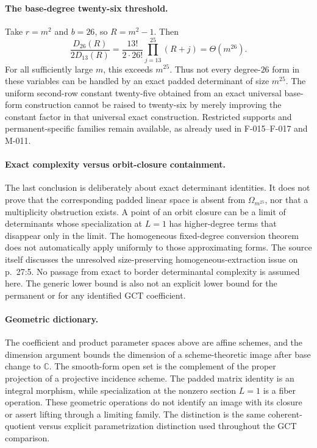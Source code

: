 \paragraph{The base-degree twenty-six threshold.}
Take $r=m^2$ and $b=26$, so $R=m^2-1$. Then
\[
 \frac{D_{26}(R)}{2D_{13}(R)}
   =\frac{13!}{2\cdot26!}\prod_{j=13}^{25}(R+j)
                         =\Theta(m^{26}).              \tag{O-016.3}
\]
For all sufficiently large $m$, this exceeds $m^{25}$.
Thus not every degree-$26$ form in these variables can be
handled by an exact padded determinant of size $m^{25}$.
The uniform second-row constant twenty-five obtained from
an exact universal base-form construction cannot be raised
to twenty-six by merely improving the constant factor in
that universal exact construction. Restricted supports and
permanent-specific families remain available, as already
used in F-015--F-017 and M-011.

\paragraph{Exact complexity versus orbit-closure containment.}
The last conclusion is deliberately about exact determinant
identities. It does not prove that the corresponding padded
linear space is absent from $\Omega_{m^{25}}$, nor that a
multiplicity obstruction exists. A point of an orbit closure
can be a limit of determinants whose specialization at $L=1$
has higher-degree terms that disappear only in the limit.
The homogeneous fixed-degree conversion theorem does not
automatically apply uniformly to those approximating forms.
The source itself discusses the unresolved size-preserving
homogeneous-extraction issue on p.~27:5. No passage from
exact to border determinantal complexity is assumed here.
The generic lower bound is also not an explicit lower bound
for the permanent or for any identified GCT coefficient.

\paragraph{Geometric dictionary.}
The coefficient and product parameter spaces above are affine
schemes, and the dimension argument bounds the dimension of
a scheme-theoretic image after base change to $\mathbb C$.
The smooth-form open set is the complement of the proper
projection of a projective incidence scheme. The padded
matrix identity is an integral morphism, while specialization
at the nonzero section $L=1$ is a fiber operation.
These geometric operations do not identify an image with
its closure or assert lifting through a limiting family.
The distinction is the same coherent-quotient versus explicit
parametrization distinction used throughout the GCT comparison.
